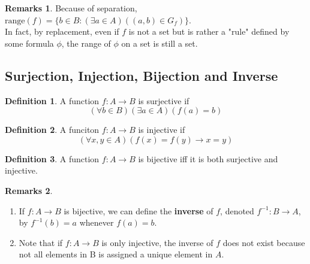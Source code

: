 \documentclass[14pt]{article}
\theoremstyle{definition}
\newtheorem*{remark}{Remarks}
\newtheorem{definition}{Definition}[subsection]
\begin{document}
\begin{remark}
    Because of separation, $ \mathrm{range}(f)=\{ b\in B\colon ( \exists a\in A)((a,b)\in G_f)\}$.
\\In fact, by replacement, even if $f$ is not a set but is rather a "rule" defined by some formula $\phi$, the range of $\phi$ on a set is still a set.
\end{remark}


\vspace{5mm} %

\subsection{Surjection, Injection, Bijection and Inverse}

\begin{definition}
    A function $f\colon A\rightarrow B $ is surjective if 
\begin{equation*}
    (\forall b\in B)(\exists a\in A)(f(a)=b)
\end{equation*}
\end{definition}

\begin{definition}
    A funciton $f\colon A\rightarrow B $ is injective if
\begin{equation*}
    (\forall x,y\in A)(f(x)=f(y)\rightarrow x=y)
\end{equation*}
\end{definition}

\begin{definition}
    A function $f\colon A\rightarrow B $ is bijective iff it is both surjective and injective.
\end{definition}

\begin{remark}
    \hfill
    \begin{enumerate}
    \item If $ f\colon A\rightarrow B $ is bijective, we can define the \textbf{inverse} of $f$, denoted $f^{-1}\colon B \rightarrow A$, by $ f^{-1}(b)=a $ whenever $ f(a)=b $.
    \item Note that if $f\colon A\rightarrow B $ is only injective, the inverse of $f$ does not exist because not all elements in B is assigned a unique element in $A$.
\end{enumerate}
\end{remark}


\vspace{5mm} %
\end{document}
